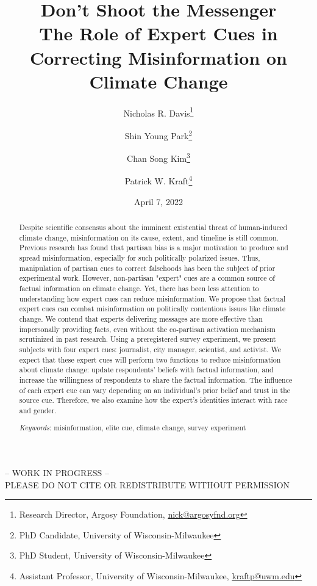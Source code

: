 \documentclass[12pt]{article}
\author{
Nicholas R. Davis\footnote{Research Director, Argosy Foundation,  \href{mailto:nick@argosyfnd.org}{nick@argosyfnd.org}}\and
Shin Young Park\footnote{PhD Candidate, University of Wisconsin-Milwaukee}\and
Chan Song Kim\footnote{PhD Student, University of Wisconsin-Milwaukee}\and
Patrick W. Kraft\footnote{Assistant Professor, University of Wisconsin-Milwaukee, \href{mailto:kraftp@uwm.edu}{kraftp@uwm.edu}}
}
\title{Don't Shoot the Messenger\\
\large{The Role of Expert Cues in Correcting Misinformation on Climate Change}}
\date{April 7, 2022}
\begin{document}
\maketitle
\thispagestyle{empty}

\begin{center}
-- WORK IN PROGRESS -- \\
PLEASE DO NOT CITE OR REDISTRIBUTE WITHOUT PERMISSION
\end{center} 

\begin{abstract}\singlespacing
\noindent Despite scientific consensus about the imminent existential threat of human-induced climate change, misinformation on its cause, extent, and timeline is still common. Previous research has found that partisan bias is a major motivation to produce and spread misinformation, especially for such politically polarized issues. Thus, manipulation of partisan cues to correct falsehoods has been the subject of prior experimental work. However, non-partisan "expert" cues are a common source of factual information on climate change. Yet, there has been less attention to understanding how expert cues can reduce misinformation. We propose that factual expert cues can combat misinformation on politically contentious issues like climate change. We contend that experts delivering messages are more effective than impersonally providing facts, even without the co-partisan activation mechanism scrutinized in past research. Using a preregistered survey experiment, we present subjects with four expert cues: journalist, city manager, scientist, and activist. We expect that these expert cues will perform two functions to reduce misinformation about climate change: update respondents' beliefs with factual information, and increase the willingness of respondents to share the factual information. The influence of each expert cue can vary depending on an individual's prior belief and trust in the source cue. Therefore, we also examine how the expert's identities interact with race and gender.

\vspace{\baselineskip}
\noindent \textit{Keywords}: misinformation, elite cue, climate change, survey experiment 

\vspace{\baselineskip}
\end{abstract}
\hfill

\doublespacing

\newpage\setcounter{page}{1}

\graphicspath{ {./images/} }
\clearpage
\singlespacing



% 
\end{document}
